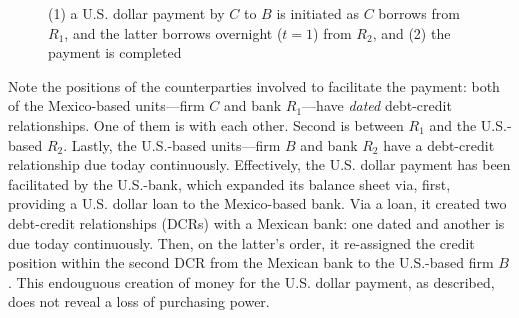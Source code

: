 \begin{figure}[!ht]
\caption{(1) a U.S. dollar payment by $C$ to $B$ is initiated as $C$ borrows from $R_1$, and the latter borrows overnight ($t=1$) from $R_2$, and (2) the payment is completed}%
\label{fig:US_MX_payment3}
\vspace{.1in}
\end{figure}

Note the positions of the counterparties involved to facilitate the payment: both of the Mexico-based units---firm $C$ and bank $R_1$---have \textit{dated} debt-credit relationships. One of them is with each other. Second is between $R_1$ and the U.S.-based $R_2$. Lastly, the U.S.-based units---firm $B$ and bank $R_2$ have a debt-credit relationship due today continuously. Effectively, the U.S. dollar payment has been facilitated by the U.S.-bank, which expanded its balance sheet via, first, providing a U.S. dollar loan to the Mexico-based bank. Via a loan, it created two debt-credit relationships (DCRs) with a Mexican bank: one dated and another is due today continuously. Then, on the latter's order, it re-assigned the credit position within the second DCR from the Mexican bank to the U.S.-based firm $B$. This endouguous creation of money for the U.S. dollar payment, as described, does not reveal a loss of purchasing power.   

